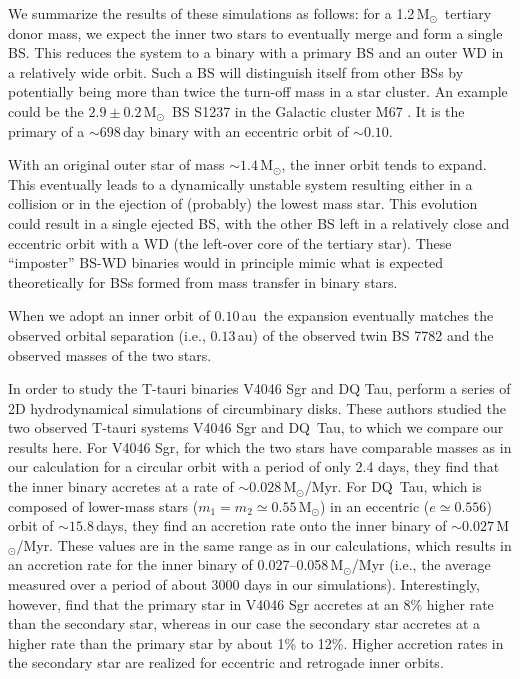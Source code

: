 \documentclass{aastex62}
\newcommand{\MSun}{\mbox{M$_\odot$}}
\begin{document}
We summarize the results of these simulations as follows: for a
1.2\,\MSun\, tertiary donor mass, we expect the inner two stars to
eventually merge and form a single BS. This reduces the
system to a binary with a primary BS and an outer WD in a relatively wide orbit. Such a BS will
distinguish itself from other BSs by potentially
being more than twice the turn-off mass in a star cluster.  An
example could be the $2.9\pm0.2$\,\MSun\, BS S1237 in the
Galactic cluster M67 \cite{2016ApJ...832L..13L}. It is the primary of
a $\sim 698$\,day binary with an eccentric orbit of $\sim 0.10$.

With an original outer star of mass $\sim 1.4$\,\MSun, the inner orbit
tends to expand. This eventually leads
to a dynamically unstable system resulting either in a collision or in
the ejection of (probably) the lowest mass star. This evolution could
result in a single ejected BS, with the other BS left in
a relatively close and eccentric orbit with a WD (the
left-over core of the tertiary star).  These ``imposter'' BS-WD binaries 
would in principle mimic what is expected theoretically for BSs formed 
from mass transfer in binary stars.

When we adopt an inner orbit of $0.10$\,au\, the expansion eventually
matches the observed orbital separation (i.e., $0.13$\,au) of the observed
twin BS 7782 and the observed masses of the two stars.

In order to study the T-tauri binaries V4046 Sgr and DQ Tau,
\cite{2011MNRAS.413.2679D} perform a series of 2D hydrodynamical
simulations of circumbinary disks.  These authors studied the two
observed T-tauri systems V4046 Sgr and DQ~Tau, to which we compare our
results here.  For V4046 Sgr, for which the two stars have comparable
masses as in our calculation for a circular orbit with a period of
only 2.4 days, they find that the inner binary accretes at a rate of
$\sim 0.028$\,\MSun/Myr.  For DQ~Tau, which is composed of lower-mass
stars ($m_1 = m_2 \simeq 0.55$\,\MSun) in an eccentric ($e\simeq
0.556$) orbit of $\sim 15.8$\,days, they find an accretion rate onto
the inner binary of $\sim 0.027$\,\MSun/Myr.  These values are in the
same range as in our calculations, which results in an accretion rate
for the inner binary of 0.027--0.058\,\MSun/Myr (i.e., the average
measured over a period of about 3000 days in our simulations).
Interestingly, however, \cite{2011MNRAS.413.2679D} find that the
primary star in V4046 Sgr accretes at an 8\% higher rate than the
secondary star, whereas in our case the secondary star accretes at a
higher rate than the primary star by about 1\% to 12\%.  Higher
accretion rates in the secondary star are realized for eccentric and
retrogade inner orbits.
\end{document}
